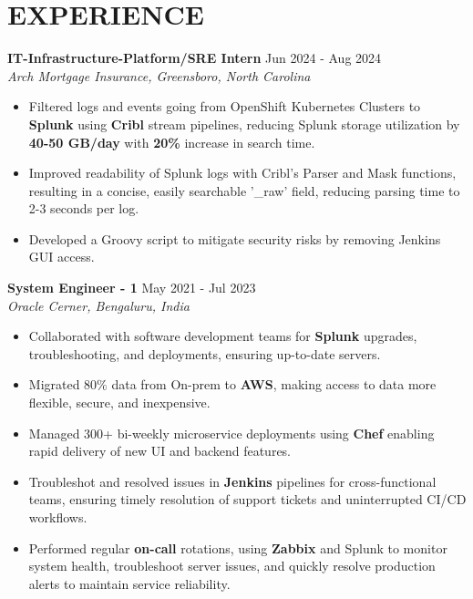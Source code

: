 \documentclass[a4paper,9pt]{extarticle}
\begin{document}
\section*{EXPERIENCE}
\noindent
\textbf{IT-Infrastructure-Platform/SRE Intern}
\hfill Jun 2024 - Aug 2024\\ %
\textit{Arch Mortgage Insurance, Greensboro, North Carolina}
\begin{itemize}
    \item Filtered logs and events going from OpenShift Kubernetes Clusters to \textbf{Splunk} using \textbf{Cribl} stream pipelines, reducing Splunk storage utilization by \textbf{40-50 GB/day} with \textbf{20\%} increase in search time.
    \item Improved readability of Splunk logs with Cribl's Parser and Mask functions, resulting in a concise, easily searchable '\_raw' field, reducing parsing time to 2-3 seconds per log.
    \item Developed a Groovy script to mitigate security risks by removing Jenkins GUI access.
    

\end{itemize}

\noindent
\textbf{System Engineer - 1}
\hfill May 2021 - Jul 2023\\ %
\textit{Oracle Cerner, Bengaluru, India}
\begin{itemize}
    \item Collaborated with software development teams for \textbf{Splunk} upgrades, troubleshooting, and deployments, ensuring up-to-date servers.
    \item Migrated 80\% data from On-prem to \textbf{AWS}, making access to data more flexible, secure, and inexpensive.
    \item Managed 300+ bi-weekly microservice deployments using \textbf{Chef} enabling rapid delivery of new UI and backend features.
    \item Troubleshot and resolved issues in \textbf{Jenkins} pipelines for cross-functional teams, ensuring timely resolution of support tickets and uninterrupted CI/CD workflows.
    \item Performed regular \textbf{on-call} rotations, using \textbf{Zabbix} and Splunk to monitor system health, troubleshoot server issues, and quickly resolve production alerts to maintain service reliability.

\end{itemize}
\end{document}

